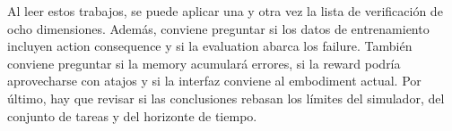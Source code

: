 \documentclass[a4paper]{article}
\begin{document}
Al leer estos trabajos, se puede aplicar una y otra vez la lista de verificación de ocho dimensiones. Además, conviene preguntar si los datos de entrenamiento incluyen action consequence y si la evaluation abarca los failure. También conviene preguntar si la memory acumulará errores, si la reward podría aprovecharse con atajos y si la interfaz conviene al embodiment actual. Por último, hay que revisar si las conclusiones rebasan los límites del simulador, del conjunto de tareas y del horizonte de tiempo.
\endgroup
\end{document}
